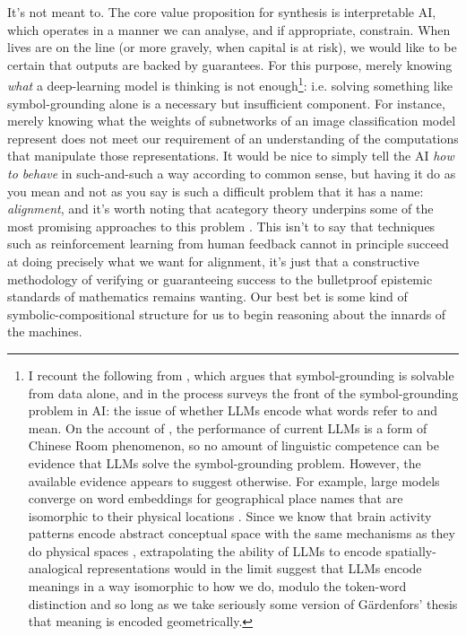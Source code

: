 It's not meant to. The core value proposition for synthesis is interpretable AI, which operates in a manner we can analyse, and if appropriate, constrain. When lives are on the line (or more gravely, when capital is at risk), we would like to be certain that outputs are backed by guarantees. For this purpose, merely knowing \emph{what} a deep-learning model is thinking is not enough\footnote{I recount the following from \citep{sogaard_grounding_2023}, which argues that symbol-grounding is solvable from data alone, and in the process surveys the front of the symbol-grounding problem in AI: the issue of whether LLMs encode what words refer to and mean. On the account of \citep{bender_climbing_2020}, the performance of current LLMs is a form of Chinese Room \citep{searle_minds_1980} phenomenon, so no amount of linguistic competence can be evidence that LLMs solve the symbol-grounding problem. However, the available evidence appears to suggest otherwise. For example, large models converge on word embeddings for geographical place names that are isomorphic to their physical locations \citep{lietard_language_2021}. Since we know that brain activity patterns encode abstract conceptual space with the same mechanisms as they do physical spaces \citep{kriegeskorte_grid_2016}, extrapolating the ability of LLMs to encode spatially-analogical representations would in the limit suggest that LLMs encode meanings in a way isomorphic to how we do, modulo the token-word distinction and so long as we take seriously some version of G\"{a}rdenfors' \citep{gardenfors_geometry_2014} thesis that meaning is encoded geometrically.}: i.e. solving something like symbol-grounding alone is a necessary but insufficient component. For instance, merely knowing what the weights of subnetworks of an image classification model represent does not meet our requirement of an understanding of the computations that manipulate those representations. It would be nice to simply tell the AI \emph{how to behave} in such-and-such a way according to common sense, but having it do as you mean and not as you say is such a difficult problem that it has a name: \emph{alignment}, and it's worth noting that acategory theory underpins some of the most promising approaches to this problem \citep{davidad_open_nodate}. This isn't to say that techniques such as reinforcement learning from human feedback cannot in principle succeed at doing precisely what we want for alignment, it's just that a constructive methodology of verifying or guaranteeing success to the bulletproof epistemic standards of mathematics remains wanting. Our best bet is some kind of symbolic-compositional structure for us to begin reasoning about the innards of the machines.\\

